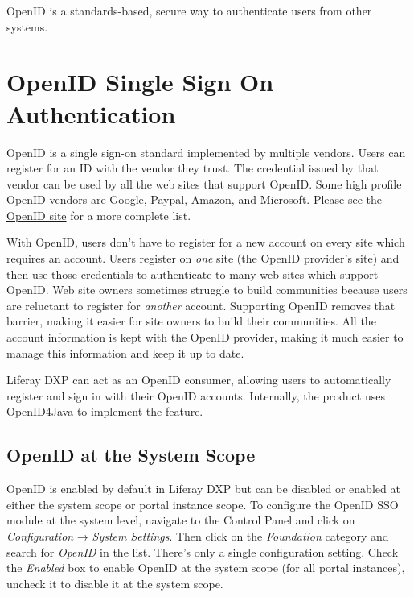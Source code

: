 OpenID is a standards-based, secure way to authenticate users from other
systems.

\section{OpenID Single Sign On
Authentication}\label{openid-single-sign-on-authentication}

OpenID is a single sign-on standard implemented by multiple vendors.
Users can register for an ID with the vendor they trust. The credential
issued by that vendor can be used by all the web sites that support
OpenID. Some high profile OpenID vendors are Google, Paypal, Amazon, and
Microsoft. Please see the \href{http://www.openid.net/}{OpenID site} for
a more complete list.

With OpenID, users don't have to register for a new account on every
site which requires an account. Users register on \emph{one} site (the
OpenID provider's site) and then use those credentials to authenticate
to many web sites which support OpenID. Web site owners sometimes
struggle to build communities because users are reluctant to register
for \emph{another} account. Supporting OpenID removes that barrier,
making it easier for site owners to build their communities. All the
account information is kept with the OpenID provider, making it much
easier to manage this information and keep it up to date.

Liferay DXP can act as an OpenID consumer, allowing users to
automatically register and sign in with their OpenID accounts.
Internally, the product uses
\href{https://github.com/jbufu/openid4java}{OpenID4Java} to implement
the feature.

\subsection{OpenID at the System
Scope}\label{openid-at-the-system-scope}

OpenID is enabled by default in Liferay DXP but can be disabled or
enabled at either the system scope or portal instance scope. To
configure the OpenID SSO module at the system level, navigate to the
Control Panel and click on \emph{Configuration} → \emph{System
Settings}. Then click on the \emph{Foundation} category and search for
\emph{OpenID} in the list. There's only a single configuration setting.
Check the \emph{Enabled} box to enable OpenID at the system scope (for
all portal instances), uncheck it to disable it at the system scope.

